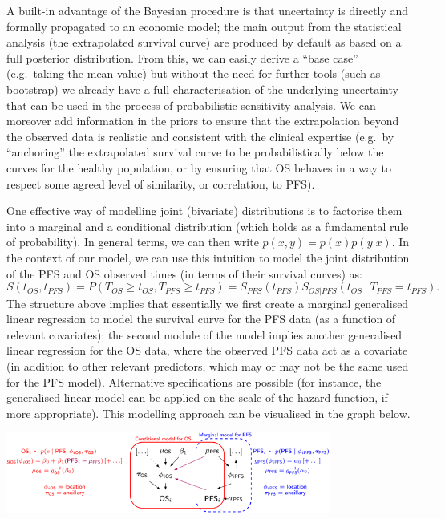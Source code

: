 \documentclass[
]{article}
\begin{document}
A built-in advantage of the Bayesian procedure is that uncertainty is
directly and formally propagated to an economic model; the main output
from the statistical analysis (the extrapolated survival curve) are
produced by default as based on a full posterior distribution. From
this, we can easily derive a ``base case'' (e.g.~taking the mean value)
but without the need for further tools (such as bootstrap) we already
have a full characterisation of the underlying uncertainty that can be
used in the process of probabilistic sensitivity analysis. We can
moreover add information in the priors to ensure that the extrapolation
beyond the observed data is realistic and consistent with the clinical
expertise (e.g.~by ``anchoring'' the extrapolated survival curve to be
probabilistically below the curves for the healthy population, or by
ensuring that OS behaves in a way to respect some agreed level of
similarity, or correlation, to PFS).

One effective way of modelling joint (bivariate) distributions is to
factorise them into a marginal and a conditional distribution (which
holds as a fundamental rule of probability). In general terms, we can
then write \(p(x,y) = p(x)p(y | x)\). In the context of our model, we
can use this intuition to model the joint distribution of the PFS and OS
observed times (in terms of their survival curves) as: \[
S(t_{OS},t_{PFS}) = P⁡(T_{OS} \geq t_{OS}, T_{PFS} \geq t_{PFS})
= S_{PFS} (t_{PFS}) S_{OS|PFS}(t_{OS}│T_{PFS} = t_{PFS}).
\] The structure above implies that essentially we first create a
marginal generalised linear regression to model the survival curve for
the PFS data (as a function of relevant covariates); the second module
of the model implies another generalised linear regression for the OS
data, where the observed PFS data act as a covariate (in addition to
other relevant predictors, which may or may not be the same used for the
PFS model). Alternative specifications are possible (for instance, the
generalised linear model can be applied on the scale of the hazard
function, if more appropriate). This modelling approach can be
visualised in the graph below.

\includegraphics[width=0.8\textwidth,height=\textheight]{DAG.png}
\end{document}
